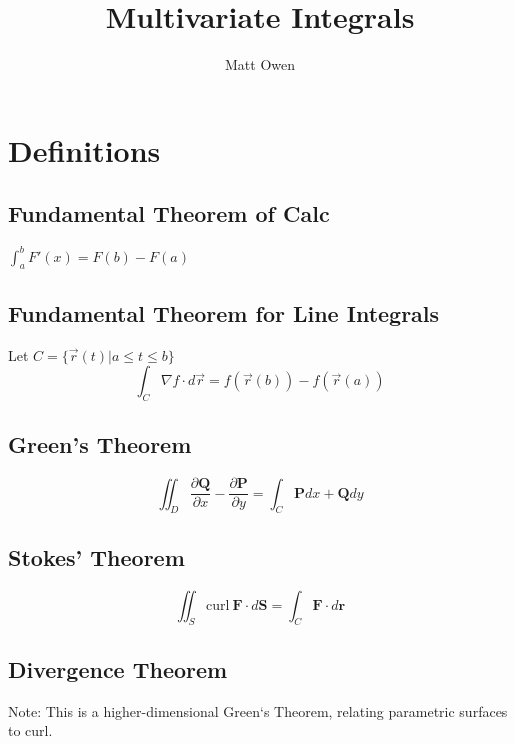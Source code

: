 \documentclass[11pt,twoside,a4paper]{article}
\title{Multivariate Integrals}
\author{Matt Owen}
\newcommand{\curl}{
  \text{curl}\ 
}
\begin{document}
\maketitle
\tableofcontents
\cleardoublepage

\section{Definitions}
\label{definitions}

\subsection{Fundamental Theorem of Calc}
\label{fun-thm-single-calc}

$\int_a^b F'(x) = F(b) - F(a)$

\subsection{Fundamental Theorem for Line Integrals}
\label{fun-thm-line-integral}

Let $C = \{ \vec{r}(t) | a \leq t \leq b \}$
$$ \int_C \nabla f \cdot d\vec{r} = f(\vec{r}(b)) - f(\vec{r}(a)) $$

\subsection{Green's Theorem}
\label{greens-theorem}

$$ \iint_D{\frac{\partial\mathbf{Q}}{\partial x} - \frac{\partial\mathbf{P}}{\partial y} } = \int_C \mathbf{P}dx + \mathbf{Q}dy$$

\subsection{Stokes' Theorem}

$$ \iint_S{\curl\mathbf{F}\cdot d\mathbf{S}} = \int_C \mathbf{F} \cdot d\mathbf{r} $$


\subsection{Divergence Theorem}

Note: This is a higher-dimensional Green`s Theorem, relating parametric surfaces to curl.
\end{document}
